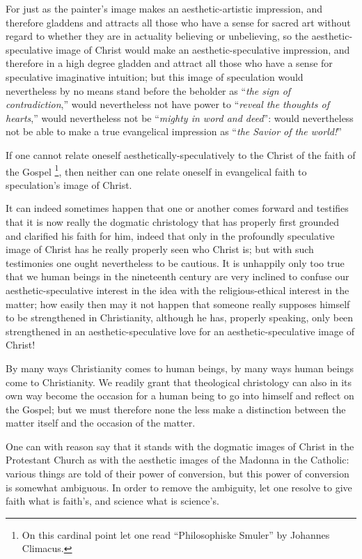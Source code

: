 \documentclass[12pt,a4paper]{book}
\begin{document}
For just as the painter's image makes an aesthetic-artistic impression, and therefore gladdens
and attracts all those who have a sense for sacred art without regard to whether they are in
actuality believing or unbelieving, so the aesthetic-speculative image of Christ would make an
aesthetic-speculative impression, and therefore in a high degree gladden and attract all those
who have a sense for speculative imaginative intuition; but this image of speculation would
nevertheless by no means stand before the beholder as ``\emph{the sign of contradiction},''
would nevertheless not have power to ``\emph{reveal the thoughts of hearts},''
would nevertheless not be ``\emph{mighty in word and deed}'': would nevertheless not be able to
make a true evangelical impression as ``\emph{the Savior of the world!}''

If one cannot relate oneself aesthetically-speculatively to the Christ of the faith of the
Gospel%
\footnote{On this cardinal point let one read ``Philosophiske Smuler'' by Johannes Climacus.},
then neither can one relate oneself in evangelical faith to speculation's image of Christ.

It can indeed sometimes happen that one or another comes forward and testifies that it is now
really the dogmatic christology that has properly first grounded and clarified his faith for
him, indeed that only in the profoundly speculative image of Christ has he really properly seen
who Christ is; but with such testimonies one ought nevertheless to be cautious. It is
unhappily only too true that we human beings in the nineteenth century are very inclined to
confuse our aesthetic-speculative interest in the idea with the religious-ethical interest in
the matter; how easily then may it not happen that someone really supposes himself to be
strengthened in Christianity, although he has, properly speaking, only been strengthened in an
aesthetic-speculative love for an aesthetic-speculative image of Christ!

By many ways Christianity comes to human beings, by many ways human beings come to
Christianity. We readily grant that theological christology can also in its own way become the
occasion for a human being to go into himself and reflect on the Gospel; but we must therefore
none the less make a distinction between the matter itself and the occasion of the matter.

One can with reason say that it stands with the dogmatic images of Christ in the Protestant
Church as with the aesthetic images of the Madonna in the Catholic: various things are told of
their power of conversion, but this power of conversion is somewhat ambiguous. In order to
remove the ambiguity, let one resolve
to give faith what is faith's, and science what is science's.
\end{document}
